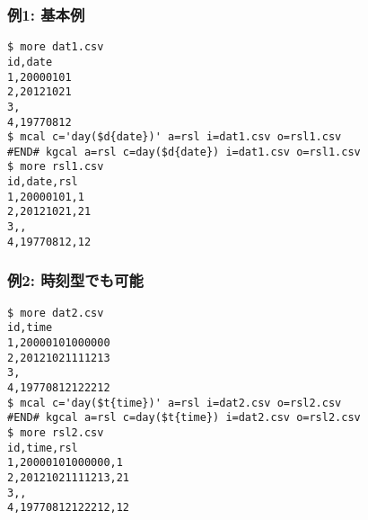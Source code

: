 \subsubsection*{例1: 基本例}



\begin{Verbatim}[baselinestretch=0.7,frame=single]
$ more dat1.csv
id,date
1,20000101
2,20121021
3,
4,19770812
$ mcal c='day($d{date})' a=rsl i=dat1.csv o=rsl1.csv
#END# kgcal a=rsl c=day($d{date}) i=dat1.csv o=rsl1.csv
$ more rsl1.csv
id,date,rsl
1,20000101,1
2,20121021,21
3,,
4,19770812,12
\end{Verbatim}
\subsubsection*{例2: 時刻型でも可能}



\begin{Verbatim}[baselinestretch=0.7,frame=single]
$ more dat2.csv
id,time
1,20000101000000
2,20121021111213
3,
4,19770812122212
$ mcal c='day($t{time})' a=rsl i=dat2.csv o=rsl2.csv
#END# kgcal a=rsl c=day($t{time}) i=dat2.csv o=rsl2.csv
$ more rsl2.csv
id,time,rsl
1,20000101000000,1
2,20121021111213,21
3,,
4,19770812122212,12
\end{Verbatim}

